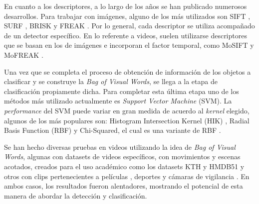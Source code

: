 En cuanto a los descriptores, a lo largo de los años se han publicado numerosos desarrollos. Para trabajar con imágenes, alguno de los más utilizados
son SIFT \parencite{lowe2004distinctive}, SURF \parencite{bay2006surf}, BRISK \parencite{leutenegger2011brisk} y FREAK \parencite{alahi2012freak}.
Por lo general, cada descriptor se utiliza acompañado de un detector específico.
En lo referente a videos, suelen utilizarse descriptores que se basan en los de imágenes e incorporan el factor temporal,
como MoSIFT \parencite{chen2009mosift} y MoFREAK \parencite{whiten2013mofreak}.

Una vez que se completa el proceso de obtención de información de los objetos a clasificar y se construye la \textit{Bag of Visual
Words}, se llega a la etapa de clasificación propiamente dicha. Para completar esta última etapa uno de los métodos más utilizado
actualmente es \textit{Support Vector Machine} (SVM). La \textit{performance} del SVM puede variar en gran medida de acuerdo al \textit{kernel}
elegido, algunos de los más populares son: Histogram Intersection Kernel (HIK) \parencite{barla2003histogram}, Radial Basis Function (RBF) y Chi-Squared,
el cual es una variante de RBF \parencite{whiten2013mofreak, nievas2011violence}.

Se han hecho diversas pruebas en videos utilizando la idea de \textit{Bag of Visual Words}, algunas con
datasets de videos específicos, con movimientos y escenas acotados, creados para el uso académico como los datasets KTH \parencite{schuldt2004recognizing}
y HMDB51 \parencite{kuehne2011hmdb} \parencite{chen2009mosift, whiten2013mofreak} y otros con clips pertenecientes a películas \parencite{chen2011violence}, deportes
 \parencite{nievas2011violence, deniz2014fast} y cámaras de vigilancia \parencite{chen2009mosift}. En ambos casos, los resultados fueron alentadores, mostrando el
potencial de esta manera de abordar la detección y clasificación.